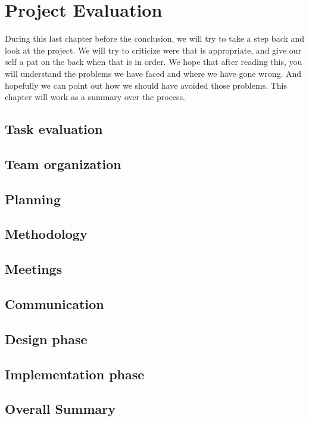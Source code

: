 \section{Project Evaluation}\label{Project Evaluation}
    During this last chapter before the conclusion, we will try to take a step back and look at the project. We will try to criticize were that is appropriate, and give our self a pat on the back when that is in order. We hope that after reading this, you will understand the problems we have faced and where we have gone wrong. And hopefully we can point out how we should have avoided those problems. This chapter will work as a summary over the process.
    
    \subsection{Task evaluation}
        
        
    \subsection{Team organization}
        
        
    \subsection{Planning}
        
        
    \subsection{Methodology}
        
        
    \subsection{Meetings}
        
        
    \subsection{Communication}
        
        
    \subsection{Design phase}
        
        
    \subsection{Implementation phase}
        
        
    \subsection{Overall Summary}    
        




